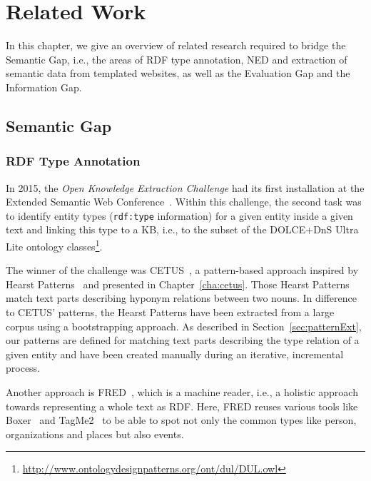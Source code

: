\chapter{Related Work}



In this chapter, we give an overview of related research required to bridge the Semantic Gap, i.e., the areas of \ac{RDF} type annotation, \ac{NED} and extraction of semantic data from templated websites, as well as the Evaluation Gap and the Information Gap.

\section{Semantic Gap}
\subsection{RDF Type Annotation}

In 2015, the \emph{Open Knowledge Extraction Challenge} had its first installation at the Extended Semantic Web Conference~\cite{okechallenge}.
Within this challenge, the second task was to identify entity types (\texttt{rdf:type} information) for a given entity inside a given text and linking this type to a \ac{KB}, i.e., to the subset of the DOLCE+DnS Ultra Lite ontology classes\footnote{\url{http://www.ontologydesignpatterns.org/ont/dul/DUL.owl}}.

The winner of the challenge was CETUS~\cite{CETUS_2015}, a pattern-based approach inspired by  Hearst Patterns~\cite{Hearst1992} and presented in Chapter~\ref{cha:cetus}.
Those Hearst Patterns match text parts describing hyponym relations between two nouns.
In difference to CETUS' patterns, the Hearst Patterns have been extracted from a large corpus using a bootstrapping approach.
As described in Section~\ref{sec:patternExt}, our patterns are defined for matching text parts describing the type relation of a given entity and have been created manually during an iterative, incremental process.

Another approach is FRED~\cite{fred_typing}, which is a machine reader, i.e., a holistic approach towards representing a whole text as \ac{RDF}. 
Here, FRED reuses various tools like Boxer~\citep{Bos:2008:WSA:1626481.1626503} and TagMe2~\cite{tagme2} to be able to spot not only the common types like person, organizations and places but also events.

